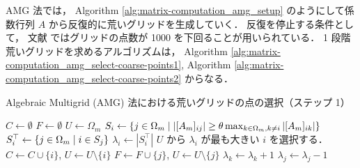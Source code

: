 AMG 法では，
Algorithm \ref{alg:matrix-computation_amg_setup}
のようにして係数行列 $A$ から反復的に荒いグリッドを生成していく．
反復を停止する条件として，
文献 \cite{Wolters2002} ではグリッドの点数が 1000 を下回ることが用いられている．
1 段階荒いグリッドを求めるアルゴリズムは，
Algorithm \ref{alg:matrix-computation_amg_select-coarse-points1},
Algorithm \ref{alg:matrix-computation_amg_select-coarse-points2}
からなる．

\begin{algorithm}[tp]
    \caption{Algebraic Multigrid (AMG) 法における荒いグリッドの点の選択（ステップ 1） \cite{Ruge1987}}
    \label{alg:matrix-computation_amg_select-coarse-points1}
    \begin{algorithmic}[1]
        \State $C \gets \emptyset$
        \State $F \gets \emptyset$
        \State $U \gets \Omega_m$
        \State $S_i \gets \left\{j \in \Omega_m \relmiddle| %
            \left| [A_m]_{ij} \right| \ge \theta %
            \max_{k \in \Omega_m, k \neq i} \left| [A_m]_{ik} \right| \right\}$
        \Comment{$\theta$ は $\theta \in (0, 1]$ な定数}
        \EndFor
        \State $S_i^\top \gets \left\{ j \in \Omega_m \mathrel{}\middle|\mathrel{} i \in S_j \right\}$
        \State $\lambda_i \gets \left| S_i^\top \right|$
        \EndFor
        \State $U$ から $\lambda_i$ が最も大きい $i$ を選択する．
        \State $C \gets C \cup \{i\}$, $U \gets U \setminus \{i\}$
        \State $F \gets F \cup \{j\}$, $U \gets U \setminus \{j\}$
        \State $\lambda_k \gets \lambda_k + 1$
        \EndFor
        \EndFor
        \State $\lambda_j \gets \lambda_j - 1$
        \EndFor
        \EndWhile
        \EndProcedure
    \end{algorithmic}
\end{algorithm}

